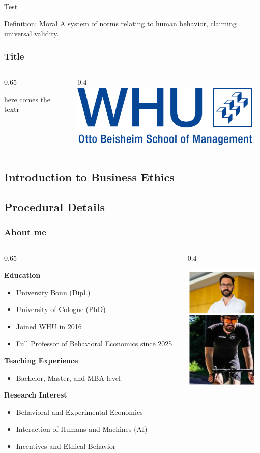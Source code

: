 \documentclass[aspectratio=169, 10pt]{beamer}
\newcommand{\twocolslide}[3]{%
  \begin{frame}
    \frametitle{#1}
    \begin{columns}[T,onlytextwidth]
      \begin{column}{0.65\textwidth}
        #2 %
      \end{column}
      \begin{column}{0.4\textwidth}
        #3 %
      \end{column}
    \end{columns}
  \end{frame}
}
\begin{document}
\begin{frame}{Test}

\begin{block}{Definition: Moral}
A system of norms relating to human behavior, claiming universal validity.
\end{block}
    
\end{frame}

\twocolslide{Title}{
here comes the textr
}
{\includegraphics[height=3cm]{pics/WHU_Logo_RGB_Screen.jpg}
}


\subsection{Introduction to Business Ethics}
\subsection{Procedural Details}
\twocolslide{About me}{

\textbf{Education}
\begin{itemize}
  \item University Bonn (Dipl.)
  \item University of Cologne (PhD)
  \item Joined WHU in 2016
  \item Full Professor of Behavioral Economics since 2025
\end{itemize}
\textbf{Teaching Experience}
\begin{itemize}
  \item Bachelor, Master, and MBA level
\end{itemize}

\textbf{Research Interest}
\begin{itemize}
  \item Behavioral and Experimental Economics
  \item Interaction of Humans and Machines (AI)
  \item Incentives and Ethical Behavior
\end{itemize}

}{
\centering
\includegraphics[height=6cm]{pics/rilke.PNG}
}
\end{document}
